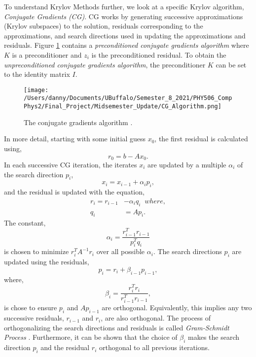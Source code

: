 \documentclass[]{article}
\begin{document}
To understand Krylov Methods further, we look at a specific Krylov algorithm, \textit{Conjugate Gradients (CG)}.  CG works by generating successive approximations (Krylov subspaces) to the solution, residuals corresponding to the approximations, and search directions  used in updating the approximations and residuals.  Figure \ref{CGAlg} contains a \textit{preconditioned conjugate gradients algorithm} where $K$ is a preconditioner and $z_i$ is the preconditioned residual. To obtain the \textit{unpreconditioned conjugate gradients algorithm}, the preconditioner $K$ can be set to the identity matrix $I$.
\begin{figure}[!ht]
\begin{center}
\texttt{[image: /Users/danny/Documents/UBuffalo/Semester\_8\_2021/PHY506\_CompPhys2/Final\_Project/Midsemester\_Update/CG\_Algorithm.png]}
\end{center}
\caption{The conjugate gradients algorithm \cite{Henk2000}.}
\label{CGAlg}
\end{figure}
In more detail, starting with some initial guess $x_0$,  the first residual is calculated using, 
\begin{equation}
r_0 = b - A x_0.
\end{equation}
In each successive CG iteration, the iterates $x_i$ are updated by a multiple $\alpha_i$ of the search direction $p_i$, 
\begin{equation}
x_i = x_{i-1} + \alpha_i p_i,
\end{equation}
and the residual is updated with the equation,
\begin{align}
r_i = r_{i-1} &- \alpha_i q_i \;\; where, \\
q_i &= A p_i.
\end{align}
The constant,
\begin{equation}
\alpha_i = \frac{r_{i-1}^T r_{i-1}}{p_i^T q_i} 
\end{equation}
is chosen to minimize $r_i^T A^{-1} r_i$ over all possible $\alpha_i$.  The search directions $p_i$ are updated using the residuals,
\begin{equation}
p_i = r_i + \beta_{i-1} p_{i-1},
\end{equation}
where,
\begin{equation}
\beta_i = \frac{r_{i}^T r_{i}}{r_{i-1}^T r_{i-1}},
\end{equation}
is chose to ensure $p_i$ and $Ap_{i-1}$ are orthogonal.  Equivalently, this implies any two successive residuals, $r_{i-1}$ and $r_i$, are also orthogonal.  The process of orthogonalizing the search directions and residuals is called \textit{Gram-Schmidt Process} \cite{Keener2000}.  Furthermore, it can be shown that the choice of $\beta_i$ makes the search direction $p_i$ and the residual $r_i$ orthogonal to all previous iterations. 
\end{document}
